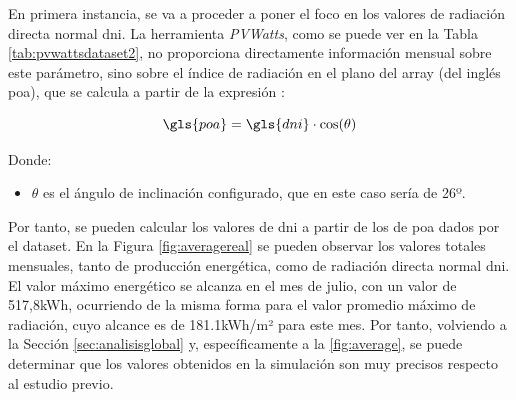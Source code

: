 En primera instancia, se va a proceder a poner el foco en los valores de radiación directa normal \gls{dni}. La herramienta \textit{PVWatts}, como se puede ver en la Tabla \ref{tab:pvwattsdataset2}, no proporciona directamente información mensual sobre este parámetro, sino sobre el índice de radiación en el plano del array (del inglés \gls{poa}), que se calcula a partir de la expresión \cite{poa}:

\[ \gls{poa} = \gls{dni} \cdot \cos(\theta) \]

    Donde:
\begin{itemize}
    \renewcommand{\labelitemi}{}
    \item \( \theta \) es el ángulo de inclinación configurado, que en este caso sería de 26º.
\end{itemize}

\vspace{3mm}

Por tanto, se pueden calcular los valores de \gls{dni} a partir de los de \gls{poa} dados por el dataset. En la Figura \ref{fig:averagereal} se pueden observar los valores totales mensuales, tanto de producción energética, como de radiación directa normal \gls{dni}. El valor máximo energético se alcanza en el mes de julio, con un valor de 517,8kWh, ocurriendo de la misma forma para el valor promedio máximo de radiación, cuyo alcance es de 181.1kWh/m² para este mes. Por tanto, volviendo a la Sección \ref{sec:analisisglobal} y, específicamente a la \ref{fig:average}, se puede determinar que los valores obtenidos en la simulación son muy precisos respecto al estudio previo.

\vspace{3mm}

